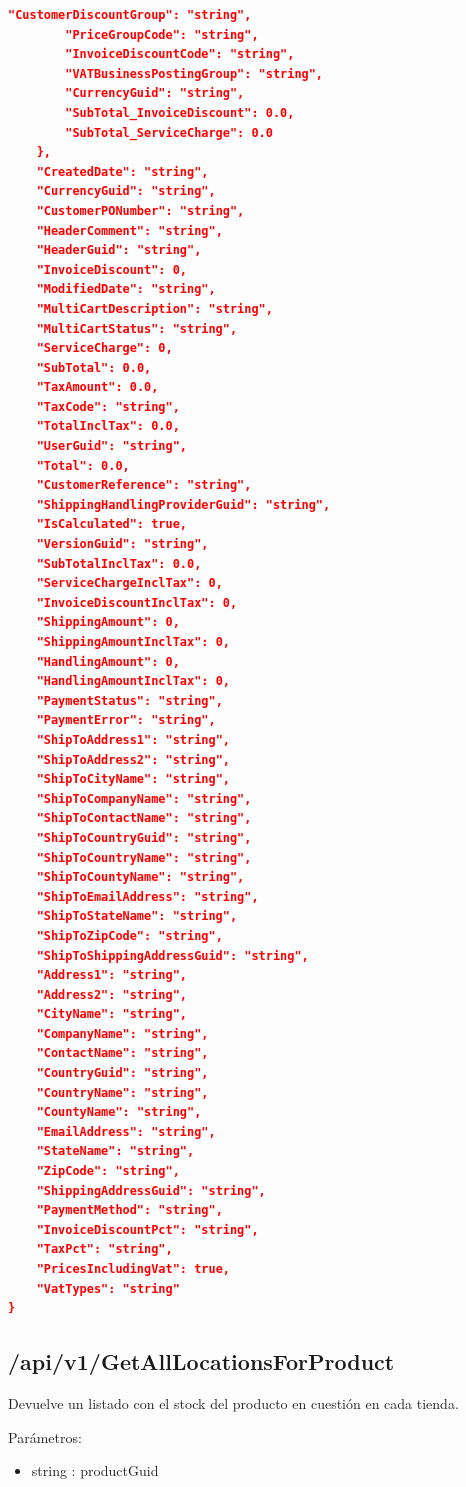 \begin{lstlisting}[language=json]
        "CustomerDiscountGroup": "string",
        "PriceGroupCode": "string",
        "InvoiceDiscountCode": "string",
        "VATBusinessPostingGroup": "string",
        "CurrencyGuid": "string",
        "SubTotal_InvoiceDiscount": 0.0,
        "SubTotal_ServiceCharge": 0.0
    },
    "CreatedDate": "string",
    "CurrencyGuid": "string",
    "CustomerPONumber": "string",
    "HeaderComment": "string",
    "HeaderGuid": "string",
    "InvoiceDiscount": 0,
    "ModifiedDate": "string",
    "MultiCartDescription": "string",
    "MultiCartStatus": "string",
    "ServiceCharge": 0,
    "SubTotal": 0.0,
    "TaxAmount": 0.0,
    "TaxCode": "string",
    "TotalInclTax": 0.0,
    "UserGuid": "string",
    "Total": 0.0,
    "CustomerReference": "string",
    "ShippingHandlingProviderGuid": "string",
    "IsCalculated": true,
    "VersionGuid": "string",
    "SubTotalInclTax": 0.0,
    "ServiceChargeInclTax": 0,
    "InvoiceDiscountInclTax": 0,
    "ShippingAmount": 0,
    "ShippingAmountInclTax": 0,
    "HandlingAmount": 0,
    "HandlingAmountInclTax": 0,
    "PaymentStatus": "string",
    "PaymentError": "string",
    "ShipToAddress1": "string",
    "ShipToAddress2": "string",
    "ShipToCityName": "string",
    "ShipToCompanyName": "string",
    "ShipToContactName": "string",
    "ShipToCountryGuid": "string",
    "ShipToCountryName": "string",
    "ShipToCountyName": "string",
    "ShipToEmailAddress": "string",
    "ShipToStateName": "string",
    "ShipToZipCode": "string",
    "ShipToShippingAddressGuid": "string",
    "Address1": "string",
    "Address2": "string",
    "CityName": "string",
    "CompanyName": "string",
    "ContactName": "string",
    "CountryGuid": "string",
    "CountryName": "string",
    "CountyName": "string",
    "EmailAddress": "string",
    "StateName": "string",
    "ZipCode": "string",
    "ShippingAddressGuid": "string",
    "PaymentMethod": "string",
    "InvoiceDiscountPct": "string",
    "TaxPct": "string",
    "PricesIncludingVat": true,
    "VatTypes": "string"
}
\end{lstlisting}

\subsection{/api/v1/GetAllLocationsForProduct}
Devuelve un listado con el stock del producto en cuestión en cada tienda.

Parámetros:
\begin{itemize}
	\item string : productGuid
\end{itemize}

